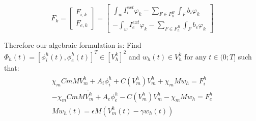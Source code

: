 \documentclass[a4paper,12pt]{article}
\begin{document}
\begin{equation}
F_k=\begin{bmatrix} F_{i,k} \\ F_{e,k} \end{bmatrix}=\begin{bmatrix} \int_{w} I_i^{ext}\varphi_k - \sum_{F \in F_h^B} \int_F b_i\varphi_k \\ - \int_{w} I_e^{ext}\varphi_k - \sum_{F \in F_h^B} \int_F b_e\varphi_k \end{bmatrix}
\end{equation}

Therefore our algebraic formulation is:
\newline
Find $\Phi_h(t)=[\phi_i^h(t),\phi_e^h(t)]^T \in [V_h^k]^2$ and $w_h(t) \in V_h^k$ for any $t \in (0;T]$ such that:
\begin{equation}\label{algebraic}
\begin{gathered}
\chi_m Cm M \dot{V_m^h}+A_i \phi_i^h+C(V_m^h) V_m^h+\chi_m M w_h=F_i^h\\
-\chi_m Cm M \dot{V_m^h}+A_e \phi_e^h-C(V_m^h) V_m^h-\chi_m M w_h=F_e^h\\
M \dot{w_h(t)}=\epsilon M (V_m^h(t)-\gamma w_h(t))
\end{gathered}
\end{equation}
 
\end{document}
